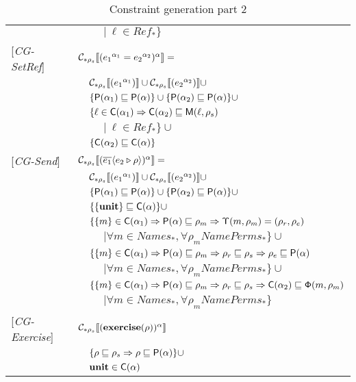 \begin{table}[hbt]
\begin{tabular} {l l l l}
&&&$|\ \ell \in Ref_*\}$\\
{[\textit{CG-SetRef}]}&\multicolumn{3}{l}{$\mathcal{C}_{*\rho_s}\llbracket ({e_1}^{\alpha_1} = {e_2}^{\alpha_2})^\alpha \rrbracket = $}\\
&&\multicolumn{2}{l}{$ \mathcal{C}_{*\rho_s}\llbracket ({e_1}^{\alpha_1}) \rrbracket \cup \mathcal{C}_{*\rho_s}\llbracket ({e_2}^{\alpha_2}) \rrbracket \cup $}\\
&&\multicolumn{2}{l}{$ \{ \mathsf{P}(\alpha_1) \sqsubseteq \mathsf{P}(\alpha) \} \cup \{ \mathsf{P}(\alpha_2) \sqsubseteq \mathsf{P}(\alpha) \} \cup $}\\
&&\multicolumn{2}{l}{$\{\ell \in \mathsf{C}(\alpha_1) \Rightarrow \mathsf{C}(\alpha_2) \sqsubseteq \mathsf{M}(\ell, \rho_s)$}\\
&&&$|\ \ell \in Ref_*\}\cup$ \\
&&\multicolumn{2}{l}{$\{ \mathsf{C}(\alpha_2) \sqsubseteq \mathsf{C}(\alpha) \}$} \\
{[\textit{CG-Send}]}&\multicolumn{3}{l}{$\mathcal{C}_{*\rho_s}\llbracket (\overline{e_1} \langle e_2 \triangleright \rho \rangle)^\alpha \rrbracket = $}\\
&&\multicolumn{2}{l}{$ \mathcal{C}_{*\rho_s}\llbracket ({e_1}^{\alpha_1}) \rrbracket \cup \mathcal{C}_{*\rho_s}\llbracket ({e_2}^{\alpha_2}) \rrbracket \cup$}\\
&&\multicolumn{2}{l}{$ \{ \mathsf{P}(\alpha_1) \sqsubseteq \mathsf{P}(\alpha) \} \cup \{ \mathsf{P}(\alpha_2) \sqsubseteq \mathsf{P}(\alpha) \} \cup$}\\
&&\multicolumn{2}{l}{$\{ \{\mathbf{unit}\} \sqsubseteq \mathsf{C}(\alpha) \} \cup$}\\
&&\multicolumn{2}{l}{$ \{ \{m\} \in \mathsf{C}(\alpha_1) \Rightarrow \mathsf{P}(\alpha) \sqsubseteq \rho_m \Rightarrow \mathsf{\Upsilon}(m, \rho_m) = (\rho_r, \rho_e)$}\\
&&&$| \forall m \in Names_*, \forall \rho_m NamePerms_*\}\cup$\\
&&\multicolumn{2}{l}{$ \{ \{m\} \in \mathsf{C}(\alpha_1) \Rightarrow \mathsf{P}(\alpha) \sqsubseteq \rho_m \Rightarrow \rho_r \sqsubseteq \rho_s \Rightarrow \rho_e \sqsubseteq \mathsf{P}(\alpha)$}\\
&&&$| \forall m \in Names_*, \forall \rho_m NamePerms_*\}\cup$\\
&&\multicolumn{2}{l}{$ \{ \{m\} \in \mathsf{C}(\alpha_1) \Rightarrow \mathsf{P}(\alpha) \sqsubseteq \rho_m \Rightarrow \rho_r \sqsubseteq \rho_s \Rightarrow \mathsf{C}(\alpha_2) \sqsubseteq \mathsf{\Phi}(m, \rho_m)$}\\
&&&$| \forall m \in Names_*, \forall \rho_m NamePerms_*\}$\\
{[\textit{CG-Exercise}]}& \multicolumn{3}{l}{$\mathcal{C}_{*\rho_s}\llbracket (\mathbf{exercise}(\rho))^\alpha \rrbracket $}\\
&&\multicolumn{2}{l}{$ \{ \rho \sqsubseteq \rho_s \Rightarrow \rho \sqsubseteq \mathsf{P}(\alpha) \} \cup $}\\
&&\multicolumn{2}{l}{$ \mathbf{unit} \in \mathsf{C}(\alpha)$}\\
\end{tabular}
\caption{Constraint generation part 2}
\label{tab:ConstGen2}
\end{table}

